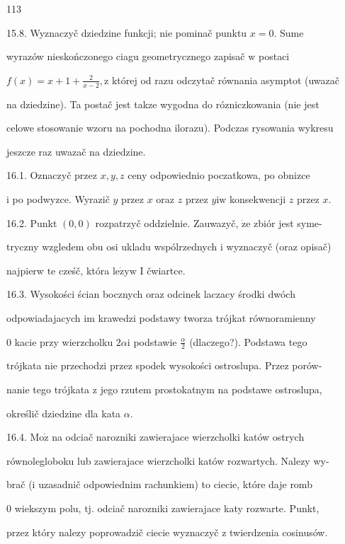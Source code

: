 \documentclass[a4paper,12pt]{article}
\begin{document}
113

15.8. Wyznaczyč dziedzine funkcji; nie pominač punktu $x=0$. Sume

wyrazów nieskończonego ciagu geometrycznego zapisač $\mathrm{w}$ postaci

$f(x)=x+1+\displaystyle \frac{2}{x-2}, \mathrm{z}$ której od razu odczytač równania asymptot (uwazač

na dziedzine). Ta postač jest takze wygodna do rózniczkowania (nie jest

celowe stosowanie wzoru na pochodna ilorazu). Podczas rysowania wykresu

jeszcze raz uwazač na dziedzine.

16.1. Oznaczyč przez $x, y, z$ ceny odpowiednio poczatkowa, po obnizce

$\mathrm{i}$ po podwyzce. Wyrazič $y$ przez $x$ oraz $z$ przez $y\mathrm{i}\mathrm{w}$ konsekwencji $z$ przez $x.$

16.2. Punkt $(0,0)$ rozpatrzyč oddzielnie. Zauwazyč, $\dot{\mathrm{z}}\mathrm{e}$ zbiór jest syme-

tryczny wzgledem obu osi ukladu wspólrzednych $\mathrm{i}$ wyznaczyč (oraz opisač)

najpierw $\mathrm{t}\mathrm{e}$ cześč, która $\mathrm{l}\mathrm{e}\dot{\mathrm{z}}\mathrm{y}\mathrm{w}$ I čwiartce.

16.3. Wysokości ścian bocznych oraz odcinek laczacy środki dwóch

odpowiadajacych im krawedzi podstawy tworza trójkat równoramienny

$0$ kacie przy wierzcholku $ 2\alpha \mathrm{i}$ podstawie $\displaystyle \frac{\alpha}{2}$ (dlaczego?). Podstawa tego

trójkata nie przechodzi przez spodek wysokości ostroslupa. Przez porów-

nanie tego trójkata $\mathrm{z}$ jego rzutem prostokatnym na podstawe ostroslupa,

określič dziedzine dla kata $\alpha.$

16.4. $\mathrm{M}\mathrm{o}\dot{\mathrm{z}}$ na odciač narozniki zawierajace wierzcholki katów ostrych

równolegloboku lub zawierajace wierzcholki katów rozwartych. Nalezy wy-

brač ($\mathrm{i}$ uzasadnič odpowiednim rachunkiem) to ciecie, które daje romb

$0$ wiekszym polu, $\mathrm{t}\mathrm{j}$. odciač narozniki zawierajace katy rozwarte. Punkt,

przez który nalezy poprowadzič ciecie wyznaczyč $\mathrm{z}$ twierdzenia cosinusów.
\end{document}
